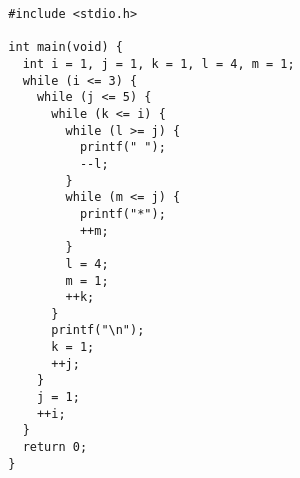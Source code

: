 \documentclass{ltjsarticle}
\begin{document}
  \begin{lstlisting}
  #include <stdio.h>

  int main(void) {
    int i = 1, j = 1, k = 1, l = 4, m = 1;
    while (i <= 3) {
      while (j <= 5) {
        while (k <= i) {
          while (l >= j) {
            printf(" ");
            --l;
          }
          while (m <= j) {
            printf("*");
            ++m;
          }
          l = 4;
          m = 1;
          ++k;
        }
        printf("\n");
        k = 1;
        ++j;
      }
      j = 1;
      ++i;
    }
    return 0;
  }
  \end{lstlisting}
\end{document}

